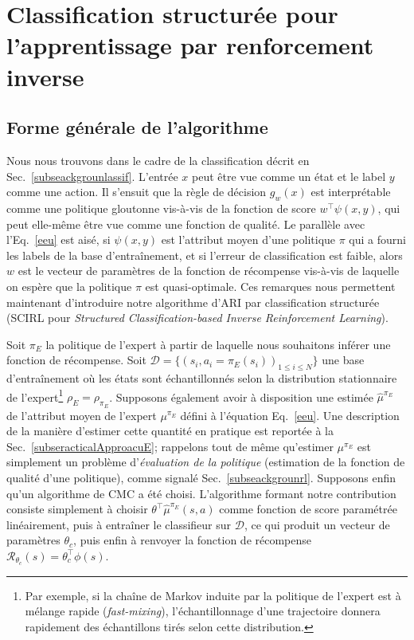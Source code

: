 \documentclass[french,utf8]{./hermes-journal}
\newcommand{\R}{\mathcal{R}}
\newcommand{\D}{\mathcal{D}}
\begin{document}
\section{Classification structurée pour l'apprentissage par renforcement inverse} \label{secirl}

\subsection{Forme générale de l'algorithme}
\label{subsecirlgo}

Nous nous trouvons dans le cadre de la classification décrit en Sec.~\ref{subseackgrounlassif}. L'entrée $x$ peut être vue comme un état et le label $y$ comme une action. Il s'ensuit que la règle de décision 
$g_w(x)$ est interprétable comme une politique gloutonne vis-à-vis de la fonction de score $w^\top \psi(x,y)$, qui peut elle-même être vue comme une fonction de qualité. Le parallèle avec l'Eq.~\eqref{eeu} est aisé, si $\psi(x,y)$ est l'attribut moyen d'une politique $\pi$ qui a fourni les labels de la base d'entraînement, et si l'erreur de classification est faible, alors $w$ est le vecteur de paramètres de la fonction de récompense vis-à-vis de laquelle on espère que la politique $\pi$ est quasi-optimale. 
Ces remarques nous permettent maintenant d'introduire notre algorithme d'ARI par classification structurée (SCIRL pour \emph{Structured Classification-based Inverse Reinforcement Learning}).

Soit $\pi_E$ la politique de l'expert à partir de laquelle nous souhaitons inférer une fonction de récompense. Soit $\D = \{(s_i, a_i=\pi_E(s_i))_{1\leq i\leq N}\}$ une base d'entraînement où les états sont échantillonnés selon la distribution stationnaire de l'expert\footnote{Par exemple, si la chaîne de Markov induite par la politique de l'expert est à mélange rapide (\emph{fast-mixing}), l'échantillonnage d'une trajectoire donnera rapidement des échantillons tirés selon cette distribution.} $\rho_E = \rho_{\pi_E}$.
Supposons également avoir à disposition une estimée $\hat{\mu}^{\pi_E}$ de l'attribut moyen de l'expert $\mu^{\pi_E}$ défini à l'équation Eq.~\eqref{eeu}. Une description de la manière d'estimer cette quantité en pratique est reportée à la Sec.~\ref{subseracticalApproacuE}; rappelons tout de même qu'estimer $\mu^{\pi_E}$ est simplement un problème d'\emph{évaluation de la politique} (estimation de la fonction de qualité d'une politique), comme signalé Sec.~\ref{subseackgrounrl}. Supposons enfin qu'un algorithme de CMC a été choisi. L'algorithme formant notre contribution consiste simplement à choisir $\theta^\top\hat{\mu}^{\pi_E}(s,a)$ comme fonction de score paramétrée linéairement, puis à entraîner le classifieur sur $\D$, ce qui produit un vecteur de paramètres $\theta_c$, puis enfin à renvoyer la fonction de récompense $\R_{\theta_c}(s) = \theta_c^\top \phi(s)$.
\end{document}
